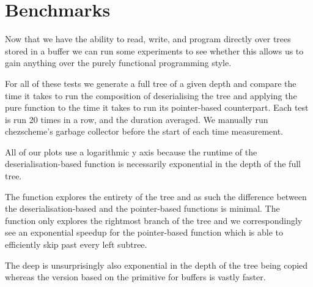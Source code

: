 


\section{Benchmarks}\label{sec:timing}

Now that we have the ability to read, write, and program directly
over trees stored in a buffer we can run some experiments to see
whether this allows us to gain anything over the purely functional
programming style.

For all of these tests we generate a full tree of a given depth and
compare the time it takes to run the composition of deserialising
the tree and applying the pure function to the time it takes to run
its pointer-based counterpart.
%
Each test is run 20 times in a row, and the duration averaged.
%
We manually run chezscheme's garbage collector before the start of
each time measurement.

All of our plots use a logarithmic y axis because the runtime of the
deserialisation-based function is necessarily exponential in the depth
of the full tree.

The  function explores the entirety of the tree
and as such the difference between the deserialisation-based and the
pointer-based functions is minimal.
%
The  function only explores the rightmost
branch of the tree and we correspondingly see an exponential speedup
for the pointer-based function which is able to efficiently skip past
every left subtree.

\begin{center}
\begin{minipage}{.45\textwidth}
\end{minipage}\qquad
\begin{minipage}{.45\textwidth}
\end{minipage}
\end{center}

The deep  is unsurprisingly also exponential in
the depth of the tree being copied whereas the version based on the
 primitive for buffers is vastly faster.

\begin{center}
\begin{minipage}{.45\textwidth}
\end{minipage}
\end{center}
